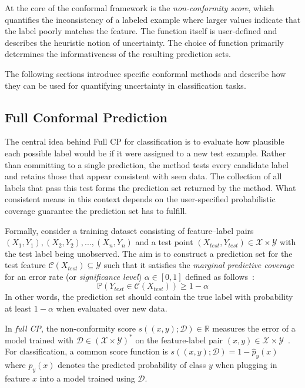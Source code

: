 At the core of the conformal framework is the \textit{non-conformity score}, which quantifies the inconsistency of a labeled example where larger values indicate that the label poorly matches the feature. The function itself is user-defined and describes the heuristic notion of uncertainty. The choice of function primarily determines the informativeness of the  resulting prediction sets.

The following sections introduce specific conformal methods and describe how they can be used for quantifying uncertainty in classification tasks.

\subsection{Full Conformal Prediction}
\label{sect:full_conformal_prediction}
The central idea behind Full \gls{CP} for classification is to evaluate how plausible each possible label would be if it were assigned to a new test example. Rather than committing to a single prediction, the method tests every candidate label and retains those that appear consistent with seen data. The collection of all labels that pass this test forms the prediction set returned by the method. What consistent means in this context depends on the user-specified probabilistic coverage guarantee the prediction set has to fulfill.

Formally, consider a training dataset consisting of feature–label pairs $(X_1, Y_1), (X_2, Y_2), ..., (X_n, Y_n)$ and a test point $(X_{test}, Y_{test}) \in \mathcal{X} \times \mathcal{Y}$ with the test label being unobserved. The aim is to construct a prediction set for the test feature $\mathcal{C}(X_{test}) \subseteq \mathcal{Y}$ such that it satisfies the \textit{marginal predictive coverage} for an error rate (or \textit{significance level}) $\alpha \in [0, 1]$ defined as follows~\cite{Angelopoulus-ConformalPrediction-2023, Zhou-ConformalPredictionDataPerspective-2025, Angelopoulos-ConformalPredictionTheory-2025}:
$$\mathbb{P}(Y_{test} \in \mathcal{C}(X_{test})) \ge 1 - \alpha$$
In other words, the prediction set should contain the true label with probability at least $1−\alpha$ when evaluated over new data.

In \textit{full \gls{CP}}, the non-conformity score $s((x, y); \mathcal{D}) \in \mathbb{R}$ measures the error of a model trained with $\mathcal{D} \in (\mathcal{X} \times \mathcal{Y})^*$ on the feature-label pair $(x,y) \in \mathcal{X} \times \mathcal{Y}$~\cite{Angelopoulus-ConformalPrediction-2023}. For classification, a common  score function is $s((x, y); \mathcal{D}) = 1 - \hat{p}_y(x)$ where $\hat{p}_y(x)$ denotes the predicted probability of class $y$ when plugging in feature $x$ into a model trained using $\mathcal{D}$.

